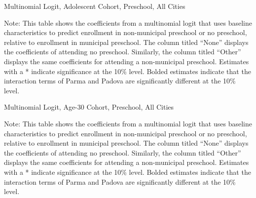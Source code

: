 \begin{table}[H]
\centering
\caption{Multinomial Logit, Adolescent Cohort, Preschool,  All Cities} \label{mlogit_coeff_adol}
\begin{threeparttable}

\begin{tablenotes}
\footnotesize\raggedright{Note: This table shows the coefficients from a multinomial logit that uses baseline characteristics to predict enrollment in non-municipal preschool or no preschool, relative to enrollment in municipal preschool. The column titled ``None'' displays the coefficients of attending no preschool. Similarly, the column titled ``Other'' displays the same coefficients for attending a non-municipal preschool. Estimates with a * indicate significance at the 10\% level. Bolded  estimates indicate that the interaction terms of Parma and Padova are significantly different at the 10\% level.}
\end{tablenotes}
\end{threeparttable}
\end{table}


\begin{table}[H]
\centering
\caption{Multinomial Logit, Age-30 Cohort, Preschool, All Cities} \label{mlogit_coeff_age30}
\begin{threeparttable}

\begin{tablenotes}
\footnotesize\raggedright{Note: This table shows the coefficients from a multinomial logit that uses baseline characteristics to predict enrollment in non-municipal preschool or no preschool, relative to enrollment in municipal preschool. The column titled ``None'' displays the coefficients of attending no preschool. Similarly, the column titled ``Other'' displays the same coefficients for attending a non-municipal preschool. Estimates with a * indicate significance at the 10\% level. Bolded  estimates indicate that the interaction terms of Parma and Padova are significantly different at the 10\% level.}
\end{tablenotes}
\end{threeparttable}
\end{table}

